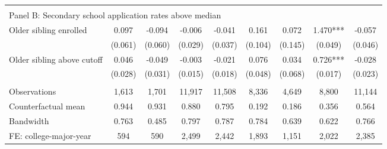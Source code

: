 {{\begin{tabular}{lcccccccc}
&  &  &  & & & & & &    \\
\multicolumn{9}{l}{Panel B: Secondary school application rates above median} \\
Older sibling enrolled&       0.097   &      -0.094   &      -0.006   &      -0.041   &       0.161   &       0.072   &       1.470***&      -0.057   \\
                    &     (0.061)   &     (0.060)   &     (0.029)   &     (0.037)   &     (0.104)   &     (0.145)   &     (0.049)   &     (0.046)   \\
 
Older sibling above cutoff&       0.046   &      -0.049   &      -0.003   &      -0.021   &       0.076   &       0.034   &       0.726***&      -0.028   \\
                    &     (0.028)   &     (0.031)   &     (0.015)   &     (0.018)   &     (0.048)   &     (0.068)   &     (0.017)   &     (0.023)   \\
                    &               &               &               &               &               &               &               &               \\
Observations        &       1,613   &       1,701   &      11,917   &      11,508   &       8,336   &       4,649   &       8,800   &      11,144   \\
Counterfactual mean &       0.944   &       0.931   &       0.880   &       0.795   &       0.192   &       0.186   &       0.356   &       0.564   \\
Bandwidth           &       0.763   &       0.485   &       0.797   &       0.787   &       0.784   &       0.639   &       0.622   &       0.766   \\
FE: college-major-year&         594   &         590   &       2,499   &       2,442   &       1,893   &       1,151   &       2,022   &       2,385   \\
 

\bottomrule
\end{tabular}
}
}

